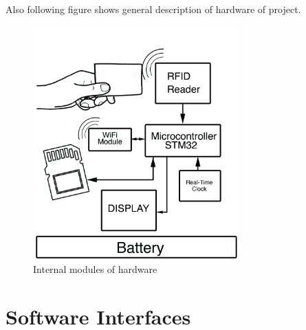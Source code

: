 \documentclass{scrreprt}
\begin{document}
Also following figure shows general description of hardware of project.
\begin{figure}
 \begin{center}
	\includegraphics[width=80mm]{blockdiagram.jpg}
  	\caption{Internal modules of hardware}
  \end{center}
\end{figure}



\section{Software Interfaces}
\end{document}
